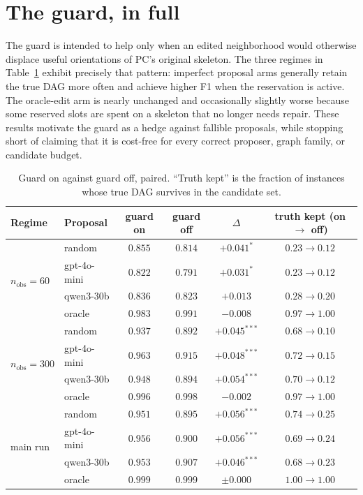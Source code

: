 \documentclass{article}
\begin{document}
\section{The guard, in full}
\label{app:guard}

The guard is intended to help only when an edited neighborhood would otherwise displace useful
orientations of PC's original skeleton. The three regimes in Table~\ref{tab:guard} exhibit precisely
that pattern: imperfect proposal arms generally retain the true DAG more often and achieve higher F1
when the reservation is active. The oracle-edit arm is nearly unchanged and occasionally slightly
worse because some reserved slots are spent on a skeleton that no longer needs repair. These results
motivate the guard as a hedge against fallible proposals, while stopping short of claiming that it is
cost-free for every correct proposer, graph family, or candidate budget.

\begin{table}[h]
\caption{Guard on against guard off, paired. ``Truth kept'' is the fraction of instances whose
true DAG survives in the candidate set.}
\label{tab:guard}
\centering
\small
\setlength{\tabcolsep}{5pt}
\begin{tabular}{llcccc}
\toprule
Regime & Proposal & guard on & guard off & $\Delta$ & truth kept (on $\to$ off) \\
\midrule
\multirow{4}{*}{$n_{\mathrm{obs}}{=}60$}
 & random         & $0.855$ & $0.814$ & $+0.041^{*}$ & $0.23 \to 0.12$ \\
 & gpt-4o-mini    & $0.822$ & $0.791$ & $+0.031^{*}$ & $0.23 \to 0.12$ \\
 & qwen3-30b      & $0.836$ & $0.823$ & $+0.013$     & $0.28 \to 0.20$ \\
 & oracle         & $0.983$ & $0.991$ & $-0.008$     & $0.97 \to 1.00$ \\
\midrule
\multirow{4}{*}{$n_{\mathrm{obs}}{=}300$}
 & random         & $0.937$ & $0.892$ & $+0.045^{***}$ & $0.68 \to 0.10$ \\
 & gpt-4o-mini    & $0.963$ & $0.915$ & $+0.048^{***}$ & $0.72 \to 0.15$ \\
 & qwen3-30b      & $0.948$ & $0.894$ & $+0.054^{***}$ & $0.70 \to 0.12$ \\
 & oracle         & $0.996$ & $0.998$ & $-0.002$       & $0.97 \to 1.00$ \\
\midrule
\multirow{4}{*}{main run}
 & random         & $0.951$ & $0.895$ & $+0.056^{***}$ & $0.74 \to 0.25$ \\
 & gpt-4o-mini    & $0.956$ & $0.900$ & $+0.056^{***}$ & $0.69 \to 0.24$ \\
 & qwen3-30b      & $0.953$ & $0.907$ & $+0.046^{***}$ & $0.68 \to 0.23$ \\
 & oracle         & $0.999$ & $0.999$ & $\pm 0.000$    & $1.00 \to 1.00$ \\
\bottomrule
\end{tabular}
\end{table}
\end{document}
